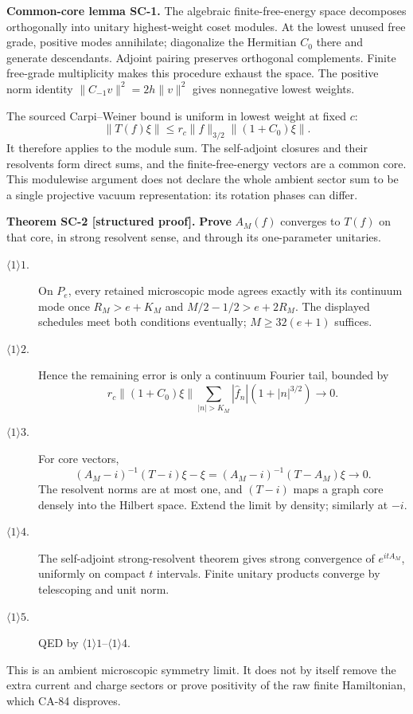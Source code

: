 \textbf{Common-core lemma SC-1.} The algebraic finite-free-energy space
decomposes orthogonally into unitary highest-weight coset modules. At the
lowest unused free grade, positive modes annihilate; diagonalize the
Hermitian $C_0$ there and generate descendants. Adjoint pairing preserves
orthogonal complements. Finite free-grade multiplicity makes this procedure
exhaust the space. The positive norm identity
$\|C_{-1}v\|^2=2h\|v\|^2$ gives nonnegative lowest weights.

The sourced Carpi--Weiner bound is uniform in lowest weight at fixed $c$:
\[
 \|T(f)\xi\|\le r_c\|f\|_{3/2}\|(1+C_0)\xi\|.
\]
It therefore applies to the module sum. The self-adjoint closures and their
resolvents form direct sums, and the finite-free-energy vectors are a common
core. This modulewise argument does not declare the whole ambient sector
sum to be a single projective vacuum representation: its rotation phases
can differ.

\textbf{Theorem SC-2 [structured proof].}
\textbf{Prove} $A_M(f)$ converges to $T(f)$ on that core, in strong
resolvent sense, and through its one-parameter unitaries.
\begin{description}
\item[$\langle1\rangle1$.] On $P_e$, every retained microscopic mode
agrees exactly with its continuum mode once
$R_M>e+K_M$ and $M/2-1/2>e+2R_M$. The displayed schedules meet both
conditions eventually; $M\ge32(e+1)$ suffices.
\item[$\langle1\rangle2$.] Hence the remaining error is only a
continuum Fourier tail, bounded by
\[
 r_c\|(1+C_0)\xi\|
 \sum_{|n|>K_M}|\widehat f_n|(1+|n|^{3/2})\longrightarrow0.
\]
\item[$\langle1\rangle3$.] For core vectors,
\[
 (A_M-i)^{-1}(T-i)\xi-\xi
   =(A_M-i)^{-1}(T-A_M)\xi\longrightarrow0.
\]
The resolvent norms are at most one, and $(T-i)$ maps a graph core densely
into the Hilbert space. Extend the limit by density; similarly at $-i$.
\item[$\langle1\rangle4$.] The self-adjoint strong-resolvent theorem
gives strong convergence of $e^{itA_M}$, uniformly on compact $t$ intervals.
Finite unitary products converge by telescoping and unit norm.
\item[$\langle1\rangle5$.] QED by $\langle1\rangle1$--$\langle1\rangle4$.
\end{description}
This is an ambient microscopic symmetry limit. It does not by itself remove
the extra current and charge sectors or prove positivity of the raw finite
Hamiltonian, which CA-84 disproves.

